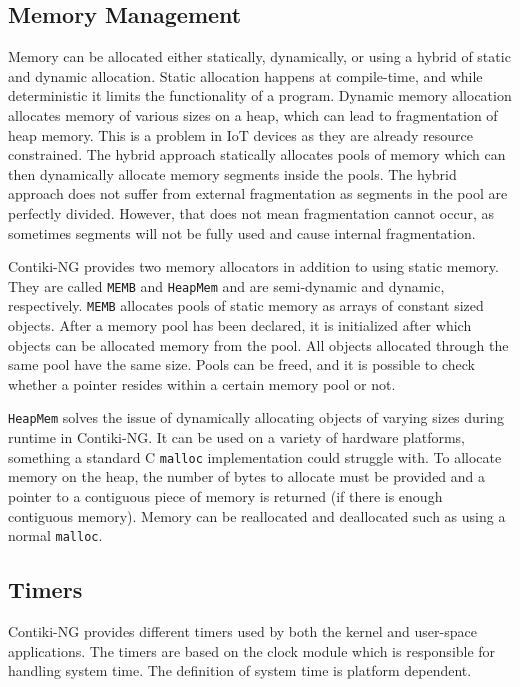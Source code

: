 \documentclass[0-thesis.tex]{subfiles}
\begin{document}
\subsection{Memory Management}
\label{ssec:memory}
Memory can be allocated either statically, dynamically, or using a hybrid of static and
dynamic allocation. Static allocation happens at compile-time, and while deterministic it
limits the functionality of a program. Dynamic memory allocation allocates memory of
various sizes on a heap, which can lead to fragmentation of heap memory. This is a problem
in IoT devices as they are already resource constrained. The hybrid approach statically
allocates pools of memory which can then dynamically allocate memory segments inside the
pools. The hybrid approach does not suffer from external fragmentation as segments in the
pool are perfectly divided. However, that does not mean fragmentation cannot occur, as
sometimes segments will not be fully used and cause internal fragmentation.

Contiki-NG provides two memory allocators in addition to using static memory. They are
called \texttt{MEMB} and \texttt{HeapMem} and are semi-dynamic and dynamic, respectively.
\texttt{MEMB} allocates pools of static memory as arrays of constant sized objects. After
a memory pool has been declared, it is initialized after which objects can be allocated
memory from the pool. All objects allocated through the same pool have the same size.
Pools can be freed, and it is possible to check whether a pointer resides within a certain
memory pool or not.

\texttt{HeapMem} solves the issue of dynamically allocating objects of varying sizes
during runtime in Contiki-NG. It can be used on a variety of hardware platforms, something
a standard C \texttt{malloc} implementation could struggle with. To allocate memory on the
heap, the number of bytes to allocate must be provided and a pointer to a contiguous piece
of memory is returned (if there is enough contiguous memory). Memory can be reallocated
and deallocated such as using a normal \texttt{malloc}.

\subsection{Timers}
\label{ssec:timers}
Contiki-NG provides different timers used by both the kernel and user-space applications.
The timers are based on the clock module which is responsible for handling system time.
The definition of system time is platform dependent.
\end{document}
